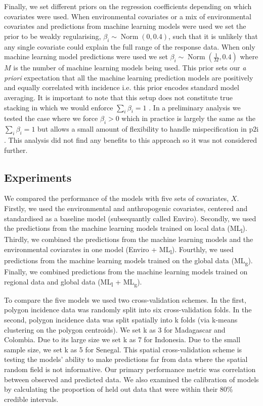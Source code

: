 \documentclass[review]{elsarticle}
\begin{document}
Finally, we set different priors on the regression coefficients depending on which covariates were used.
When environmental covariates or a mix of environmental covariates and predictions from machine learning models were used we set the prior to be weakly regularising, $\beta_i \sim \operatorname{Norm}(0, 0.4)$, such that it is unlikely that any single covariate could explain the full range of the response data.
When only machine learning model predictions were used we set $\beta_i \sim \operatorname{ Norm}(\frac{1}{M}, 0.4)$ where $M$ is the number of machine learning models being used. 
This prior  sets our \emph{a priori} expectation that all the machine learning prediction models are positively and equally correlated with incidence i.e. this prior encodes standard model averaging.
It is important to note that this setup does not constitute true stacking in which we would enforce $\sum_i \beta_i = 1$ \citep{bhatt2017improved}.
In a preliminary analysis we tested the case where we force $\beta_i > 0$ which in practice is largely the same as the $\sum_i \beta_i = 1$  \citep{breiman1996stacked} but allows a small amount of flexibility to handle mispecification in $\mathrm{p2i}$.
This analysis did not find any benefits to this approach so it was not considered further.


\subsection{Experiments}
We compared the performance of the models with five sets of covariates, $X$.
Firstly, we used the environmental and anthropogenic covariates, centered and standardised as a baseline model (subsequantly called Enviro).
Secondly, we used the predictions from the machine learning models trained on local data (ML\textsubscript{l}).
Thirdly, we combined the predictions from the machine learning models and the environmental coviarates in one model (Enviro + ML\textsubscript{l}).
Fourthly, we used predictions from the machine learning models trained on the global data (ML\textsubscript{g}).
Finally, we combined predictions from the machine learning models trained on regional data and global data (ML\textsubscript{l} + ML\textsubscript{g}).


To compare the five models we used two cross-validation schemes. 
In the first, polygon incidence data was randomly split into six cross-validation folds.
In the second, polygon incidence data was split spatially into k folds (via k-means clustering on the polygon centroids).
We set k as 3 for Madagascar and Colombia.
Due to its large size we set k as 7 for Indonesia.
Due to the small sample size, we set k as 5 for Senegal.
This spatial cross-validation scheme is testing the models' ability to make predictions far from data where the spatial random field is not informative.
Our primary performance metric was correlation between observed and predicted data.
We also examined the calibration of models by calculating the proportion of held out data that were within their 80\% credible intervals.
\end{document}
